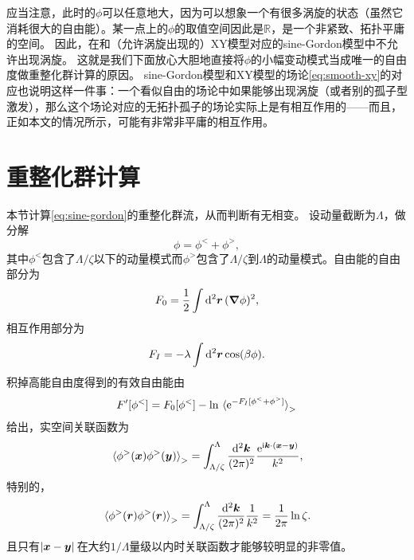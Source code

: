 \documentclass[hyperref, UTF8, a4paper]{ctexart}
\newcommand*{\ii}{\mathrm{i}}
\newcommand*{\ee}{\mathrm{e}}
\begin{document}
应当注意，此时的$\phi$可以任意地大，因为可以想象一个有很多涡旋的状态（虽然它消耗很大的自由能）。某一点上的$\phi$的取值空间因此是$\mathbb{R}$，是一个非紧致、拓扑平庸的空间。
因此，在和（允许涡旋出现的）XY模型对应的sine-Gordon模型中不允许出现涡旋。
这就是我们下面放心大胆地直接将$\phi$的小幅变动模式当成唯一的自由度做重整化群计算的原因。
sine-Gordon模型和XY模型的场论\eqref{eq:smooth-xy}的对应也说明这样一件事：一个看似自由的场论中如果能够出现涡旋（或者别的孤子型激发），那么这个场论对应的无拓扑孤子的场论实际上是有相互作用的——而且，正如本文的情况所示，可能有非常非平庸的相互作用。

\section{重整化群计算}

本节计算\eqref{eq:sine-gordon}的重整化群流，从而判断有无相变。
设动量截断为$\Lambda$，做分解
\[
    \phi = \phi^< + \phi^>,
\]
其中$\phi^<$包含了$\Lambda/\zeta$以下的动量模式而$\phi^>$包含了$\Lambda/\zeta$到$\Lambda$的动量模式。自由能的自由部分为
\[
    F_0 = \frac{1}{2} \int \dd[2]{\vb*{r}} (\grad{\phi})^2,
\]
相互作用部分为
\[
    F_I = - \lambda \int \dd[2]{\vb*{r}} \cos(\beta \phi).
\]
积掉高能自由度得到的有效自由能由
\[
    F'[\phi^<] = F_0[\phi^<] - \ln \expval*{\ee^{-F_I[\phi^< +  \phi^>]}}_>
\]
给出，实空间关联函数为
\[
    \expval*{\phi^>(\vb*{x}) \phi^>(\vb*{y})}_> = \int^\Lambda_{\Lambda/\zeta} \frac{\dd[2]{\vb*{k}}}{(2\pi)^2} \frac{\ee^{\ii \vb*{k} \cdot (\vb*{x} - \vb*{y})}}{k^2},
\]
特别的，
\[
    \expval*{\phi^>(\vb*{r}) \phi^>(\vb*{r})}_> = \int_{\Lambda/\zeta}^\Lambda \frac{\dd[2]{\vb*{k}}}{(2\pi)^2} \frac{1}{k^2} = \frac{1}{2\pi} \ln \zeta.
\]
且只有$\abs*{\vb*{x} - \vb*{y}}$在大约$1/\Lambda$量级以内时关联函数才能够较明显的非零值。
\end{document}
